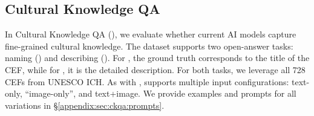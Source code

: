 \subsection{Cultural Knowledge QA}
\label{sec:ckqa}
%
In \dsname Cultural Knowledge QA (\ckqa), we evaluate whether current AI models capture fine-grained cultural knowledge.
%
%
The dataset supports two open-answer tasks: naming (\ckqan) and describing (\ckqad).
%
For \ckqan, the ground truth corresponds to the title of the CEF, while for \ckqad, it is the detailed description.
%
For both tasks, we leverage all 728 CEFs from UNESCO ICH.
%
As with \coqa, \ckqa supports multiple input configurations: text-only, ``image-only'', and text+image.
%
We provide examples and prompts for all variations in \S\ref{appendix:sec:ckqa:prompts}.
%

